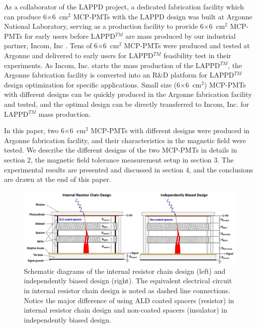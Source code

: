 \documentclass[preprint,5p]{elsarticle}
\begin{document}
As a collaborator of the LAPPD project, a dedicated fabrication facility 
\cite{15} which can produce 6$\times$6~cm$^2$ MCP-PMTs with the LAPPD design was 
built at Argonne National Laboratory, serving as a production facility to 
provide 6$\times$6~cm$^2$ MCP-PMTs for early users before LAPPD$^{TM}$ are mass 
produced by our industrial partner, Incom, Inc \cite{16}. Tens of 
6$\times$6~cm$^2$ MCP-PMTs were produced and tested at Argonne and delivered to early 
users for LAPPD$^{TM}$ feasibility test in their experiments. As Incom, Inc.  
starts the mass production of the LAPPD$^{TM}$, the Argonne fabrication 
facility is converted into an R\&D platform for LAPPD$^{TM}$ design 
optimization for specific applications. Small size (6$\times$6~cm$^2$) MCP-PMTs 
with different designs can be quickly produced in the Argonne fabrication 
facility and tested, and the optimal design can be directly transferred to 
Incom, Inc. for LAPPD$^{TM}$ mass production. 

In this paper, two 6$\times$6~cm$^2$ MCP-PMTs with different designs were 
produced in Argonne fabrication facility, and their characteristics in the 
magnetic field were tested. We describe the different designs of the two 
MCP-PMTs in details in section 2, the magnetic field tolerance measurement 
setup in section 3. The experimental results are presented and discussed in 
section 4, and the conclusions are drawn at the end of this paper.



\begin{figure}[tbp]
\centering \includegraphics[scale=1.1]{fig/Figure1.jpg}
\caption{Schematic diagrams of the internal resistor chain design (left) and 
   independently biased design (right). The equivalent electrical circuit in 
   internal resistor chain design is noted as dashed line connections. Notice 
   the major difference of using ALD coated spacers (resistor) in internal 
   resistor chain design and non-coated spacers (insulator) in independently 
   biased design.} \label{fig:design}
\end{figure}
\end{document}

